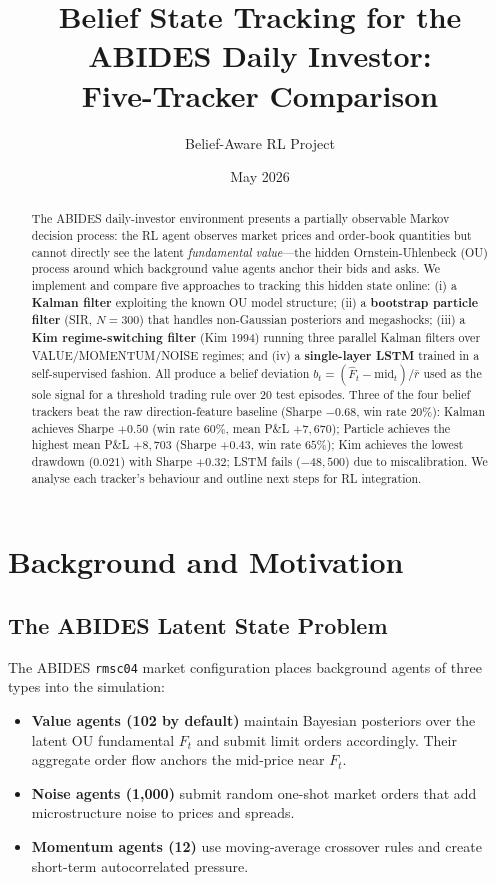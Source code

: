 \documentclass[11pt]{article}
\title{Belief State Tracking for the ABIDES Daily Investor:\\
Five-Tracker Comparison}
\author{Belief-Aware RL Project}
\date{May 2026}
\begin{document}
\maketitle

\begin{abstract}
The ABIDES daily-investor environment presents a partially observable
Markov decision process: the RL agent observes market prices and order-book
quantities but cannot directly see the latent \emph{fundamental value}---the
hidden Ornstein-Uhlenbeck (OU) process around which background value agents
anchor their bids and asks.
We implement and compare five approaches to tracking this hidden state online:
(i) a \textbf{Kalman filter} exploiting the known OU model structure;
(ii) a \textbf{bootstrap particle filter} (SIR, $N=300$) that handles
non-Gaussian posteriors and megashocks;
(iii) a \textbf{Kim regime-switching filter} (Kim 1994) running three
parallel Kalman filters over VALUE/MOMENTUM/NOISE regimes;
and (iv) a \textbf{single-layer LSTM} trained in a self-supervised fashion.
All produce a belief deviation $b_t = (\hat{F}_t - \text{mid}_t)/\bar{r}$
used as the sole signal for a threshold trading rule over 20 test episodes.
Three of the four belief trackers beat the raw direction-feature baseline
(Sharpe $-0.68$, win rate $20\%$):
Kalman achieves Sharpe $+0.50$ (win rate $60\%$, mean P\&L $+7{,}670$\textcent);
Particle achieves the highest mean P\&L $+8{,}703$\textcent{} (Sharpe $+0.43$, win rate $65\%$);
Kim achieves the lowest drawdown ($0.021$) with Sharpe $+0.32$;
LSTM fails ($-48{,}500$\textcent{}) due to miscalibration.
We analyse each tracker's behaviour and outline next steps for RL integration.
\end{abstract}

\tableofcontents
\newpage

\section{Background and Motivation}

\subsection{The ABIDES Latent State Problem}

The ABIDES \texttt{rmsc04} market configuration places background agents of
three types into the simulation:
\begin{itemize}[leftmargin=1.5em]
  \item \textbf{Value agents (102 by default)} maintain Bayesian posteriors over
    the latent OU fundamental $F_t$ and submit limit orders accordingly.
    Their aggregate order flow anchors the mid-price near $F_t$.
  \item \textbf{Noise agents (1{,}000)} submit random one-shot market orders
    that add microstructure noise to prices and spreads.
  \item \textbf{Momentum agents (12)} use moving-average crossover rules and
    create short-term autocorrelated pressure.
\end{itemize}
\end{document}

